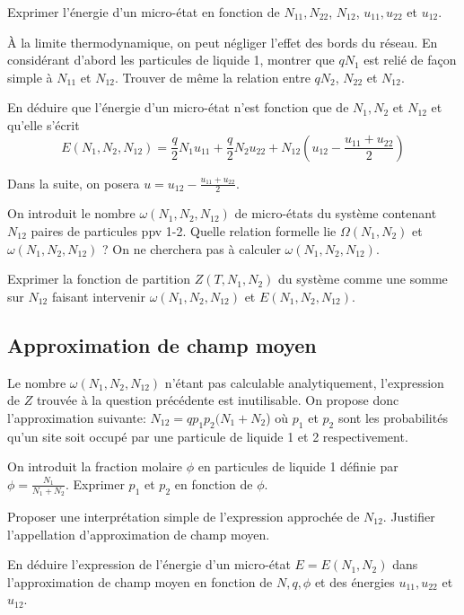 \documentclass[utf8, 11pt]{feuille}
\begin{document}
\question
Exprimer l'énergie d'un micro-état en fonction de $N_{11}, N_{22}$, $N_{12}$, $u_{11}, u_{22}$ et $u_{12}$.

\question
\`A la limite thermodynamique, on peut négliger l'effet des bords du réseau. En considérant d'abord les particules de liquide 1, montrer que $q N_1$ est relié de façon simple à $N_{11}$ et  $N_{12}$. Trouver de même la relation entre $q N_2$, $N_{22}$ et  $N_{12}$.

\question
En déduire que l'énergie d'un micro-état n'est fonction que de $N_1, N_2$ et $N_{12}$ et qu'elle s'écrit
$$
E(N_1, N_2, N_{12})= \frac{q}{2} N_1 u_{11}+\frac{q}{2} N_2 u_{22}+N_{12}(u_{12}-\frac{u_{11}+ u_{22}}{2})
$$

Dans la suite, on posera $u=u_{12}-\frac{u_{11}+ u_{22}}{2}$.

\question
On introduit le nombre $\omega(N_1, N_2, N_{12})$ de micro-états du système contenant $N_{12}$ paires de particules ppv 1-2. Quelle relation formelle lie $\Omega(N_1, N_2)$ et $\omega(N_1, N_2, N_{12})$ ? On ne cherchera pas à calculer $\omega(N_1, N_2, N_{12})$.

\question
Exprimer la fonction de partition $Z(T, N_1, N_2)$ du système comme une somme sur $N_{12}$
 faisant intervenir $\omega(N_1, N_2, N_{12})$ et $E(N_1, N_2, N_{12})$.

\subsection*{Approximation de champ moyen}

Le nombre $\omega(N_1, N_2, N_{12})$ n'étant pas calculable analytiquement, l'expression de $Z$
trouvée à la question précédente est inutilisable. On propose donc l'approximation suivante: $N_{12}=qp_1p_2(N_1 + N_2$) où $p_1$ et $p_2$ sont les probabilités qu'un site soit occupé par une particule de liquide 1 et 2 respectivement.

\question
On introduit la fraction molaire $\phi$ en particules de liquide 1 définie par $\phi=\frac{N_1}{N_1+N_2}$. Exprimer $p_1$ et $p_2$ en fonction de $\phi$.

\question
Proposer une interprétation simple de l'expression approchée de $N_{12}$. Justifier l'appellation d'approximation de \og champ moyen\fg .

\question
En déduire l'expression de l'énergie d'un micro-état $E=E(N_1, N_2)$ dans l'approximation de champ moyen en fonction de $N, q, \phi$ et des énergies $u_{11}, u_{22}$ et $u_{12}$.
\end{document}
